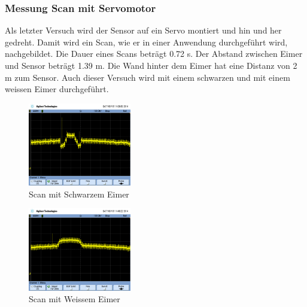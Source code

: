 \subsubsection{Messung Scan mit Servomotor}
Als letzter Versuch wird der Sensor auf ein Servo montiert und hin und her 
gedreht. Damit wird ein Scan, wie er in einer Anwendung durchgeführt wird, 
nachgebildet. Die Dauer eines Scans beträgt 0.72 s. Der Abstand zwischen 
Eimer und Sensor beträgt 1.39 m. Die Wand hinter dem Eimer hat eine Distanz 
von 2 m zum Sensor. Auch dieser Versuch wird mit einem schwarzen und mit einem 
weissen Eimer durchgeführt. 
\begin{figure}[h!]
    \centering
    \includegraphics[width=0.4\textwidth]{fig/scope_80.png}
    \caption{Scan mit Schwarzem Eimer}
    \label{fig:scan_ir_black}
\end{figure}
\begin{figure}[h!]
    \centering
    \includegraphics[width=0.4\textwidth]{fig/scope_82.png}
    \caption{Scan mit Weissem Eimer}
    \label{fig:scan_ir_white}
\end{figure}

